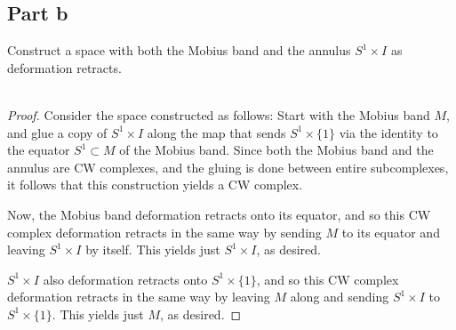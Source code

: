 \documentclass[fontsize=11pt]{scrartcl} %
\numberwithin{equation}{section} %
\numberwithin{figure}{section} %
\numberwithin{table}{section} %
\begin{document}
\subsection*{Part b}
Construct a space with both the Mobius band and the annulus $S^1\times I$ as
deformation retracts.
\\
\\
\begin{proof}
    Consider the space constructed as follows:
    Start with the Mobius band $M$, and glue a copy of $S^1\times I$ along the map
    that sends $S^1\times \{1\}$ via the identity to the equator $S^1\subset M$ of the
    Mobius band. Since both the Mobius band and the annulus are CW complexes,
    and the gluing is done between entire subcomplexes, it follows that this
    construction yields a CW complex.

    Now, the Mobius band deformation retracts onto its equator, and so this CW
    complex deformation retracts in the same way by sending $M$ to its equator
    and leaving $S^1\times I$ by itself. This yields just $S^1\times I$, as
    desired.

    $S^1\times I$ also deformation retracts onto $S^1\times \{1\}$, and so this
    CW complex deformation retracts in the same way by leaving $M$ along and
    sending $S^1\times I$ to $S^1\times \{1\}$. This yields just $M$, as
    desired.
\end{proof}

\newpage
\end{document}
